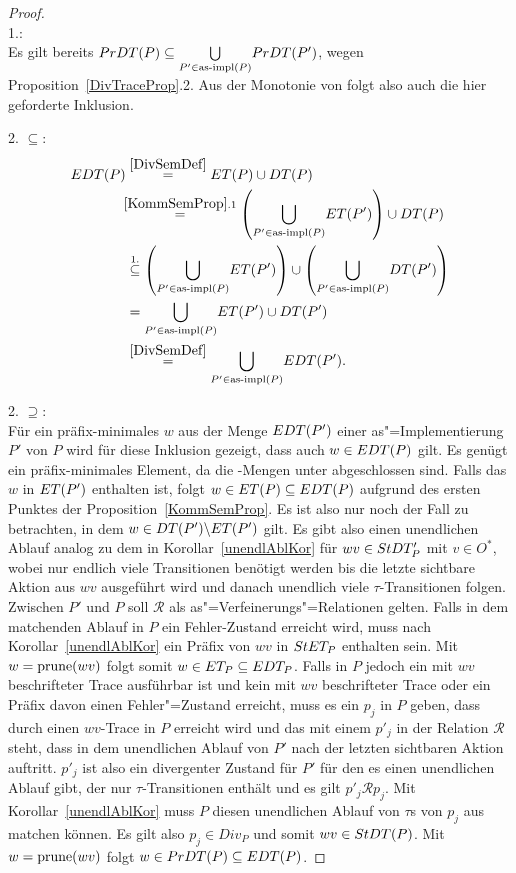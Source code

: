 \begin{proof}\mbox{}\\
  1.:\\
  Es gilt bereits $PrDT (P) \subseteq \underset{P'\in\mathrm{as}\text{-}\mathrm{impl} (P)}{\bigcup}
  PrDT (P')$, wegen Proposition~\ref{DivTraceProp}.2. Aus der Monotonie
  von \cont{} folgt also auch die hier geforderte Inklusion.

  2. \glqq$\subseteq$\grqq{}:
  {\allowdisplaybreaks
  \begin{align*}
    \EDT (P)&\overset{\ref{DivSemDef}}{=} \ET (P)\cup \DT (P)\\
    &\hspace{-0.15cm}\overset{\ref{KommSemProp}.1}{=} \left(\underset{P'\in
    \asimp (P)}{\bigcup} \ET (P')\right)\cup \DT (P)\\
    &\overset{1.}{\subseteq} \left(\underset{P'\in
    \asimp (P)}{\bigcup} \ET (P')\right)\cup \left(\underset{P'\in \asimp
    (P)}{\bigcup} \DT (P')\right)\\
    &= \underset{P'\in \asimp (P)}{\bigcup} \ET (P') \cup \DT (P')\\
    &\overset{\ref{DivSemDef}}{=} \underset{P'\in\asimp (P)}{\bigcup} \EDT
    (P').
  \end{align*}}

  2. \glqq$\supseteq$\grqq{}:\\
  Für ein präfix-minimales $w$ aus der Menge $EDT (P')$ einer
  as"=Implementierung $P'$ von $P$ wird für diese Inklusion gezeigt, dass auch
  $w\in EDT (P)$ gilt. Es genügt ein präfix-minimales Element, da die
  \EDT{}-Mengen unter \cont{} abgeschlossen sind. Falls das $w$ in $ET (P')$
  enthalten ist, folgt $w\in ET (P) \subseteq EDT (P)$ aufgrund des ersten
  Punktes der Proposition~\ref{KommSemProp}. Es ist also nur noch der Fall zu
  betrachten, in dem $w\in DT (P') \backslash ET (P')$ gilt. Es gibt also
  einen unendlichen Ablauf analog zu dem in Korollar~\ref{unendlAblKor} für $wv
  \in StDT _P'$ mit $v\in O^*$, wobei nur endlich viele Transitionen benötigt
  werden bis die letzte sichtbare Aktion aus $wv$ ausgeführt wird und danach
  unendlich viele $\tau$-Transitionen folgen. Zwischen $P'$ und $P$ soll
  $\mathcal{R}$ als as"=Verfeinerungs"=Relationen gelten. Falls in dem
  matchenden Ablauf in $P$ ein Fehler-Zustand erreicht wird, muss nach
  Korollar~\ref{unendlAblKor} ein Präfix von $wv$ in $StET _P$ enthalten sein.
  Mit $w=\mathrm{prune} (wv)$ folgt somit $w\in ET _P \subseteq EDT _P$. Falls in $P$
  jedoch ein mit $wv$ beschrifteter Trace ausführbar ist und kein mit $wv$
  beschrifteter Trace oder ein Präfix davon einen Fehler"=Zustand erreicht,
  muss es ein $p_j$ in $P$ geben, dass durch einen $wv$-Trace in $P$ erreicht
  wird und das mit einem $p'_j$ in der Relation $\mathcal{R}$ steht, dass in
  dem unendlichen Ablauf von $P'$ nach der letzten sichtbaren Aktion auftritt.
  $p'_j$ ist also ein divergenter Zustand für $P'$ für den es einen unendlichen
  Ablauf gibt, der nur $\tau$-Transitionen enthält und es gilt $p'_j\mathcal{R}
  p_j$. Mit Korollar~\ref{unendlAblKor} muss $P$ diesen unendlichen Ablauf von
  $\tau$s von $p_j$ aus matchen können. Es gilt also $p_j\in Div _P$ und somit
  $wv\in StDT (P)$. Mit $w=\mathrm{prune} (wv)$ folgt $w\in PrDT (P) \subseteq EDT
  (P)$.


\end{proof}
